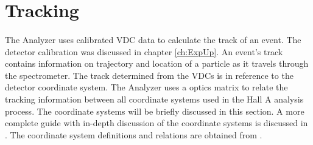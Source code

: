 \section{Tracking}
\paragraph{}The Analyzer uses calibrated VDC data to calculate the track of an event. The detector calibration was discussed in chapter \ref{ch:ExpUp}. An event's track contains information on trajectory and location of a particle as it travels through the spectrometer. The track determined from the VDCs is in reference to the detector coordinate system. The Analyzer uses a optics matrix to relate the tracking information between all coordinate systems used in the Hall A analysis process. The coordinate systems will be briefly discussed in this section. A more complete guide with in-depth discussion of the coordinate systems is discussed in \cite{espace}. The coordinate system definitions and relations are obtained from \cite{espace,HallA,optics}.
